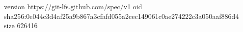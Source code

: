 version https://git-lfs.github.com/spec/v1
oid sha256:0e044c3d4af25a9b867a3cfafd055a2cec149061c0ae274222c3a050aaf886d4
size 626416
